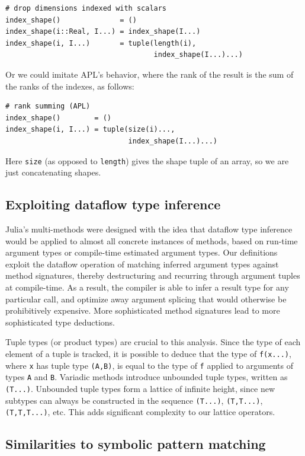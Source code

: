 \documentclass{sigplanconf}
\newcommand{\code}[1]{\texttt{#1}}
\begin{document}
{\small
\begin{verbatim}
# drop dimensions indexed with scalars
index_shape()              = ()
index_shape(i::Real, I...) = index_shape(I...)
index_shape(i, I...)       = tuple(length(i),
                                   index_shape(I...)...)
\end{verbatim}
}

Or we could imitate APL's behavior, where the rank of the result is the sum
of the ranks of the indexes, as follows:

{\small
\begin{verbatim}
# rank summing (APL)
index_shape()        = ()
index_shape(i, I...) = tuple(size(i)...,
                             index_shape(I...)...)
\end{verbatim}
}

Here \code{size} (as opposed to \code{length}) gives the shape tuple of an array,
so we are just concatenating shapes.


\subsection{Exploiting dataflow type inference}

Julia's multi-methods were designed with the idea that dataflow type inference
would be applied to almost all concrete instances of methods, based on
run-time argument types or compile-time estimated argument types.
Our definitions exploit the dataflow operation of matching inferred argument types
against method signatures, thereby destructuring and recurring through argument
tuples at compile-time. As a result, the compiler is able to infer a result type
for any particular call, and optimize away argument splicing that would otherwise
be prohibitively expensive. More sophisticated method signatures lead to more
sophisticated type deductions.

Tuple types (or product types) are crucial to this analysis. Since the type
of each element of a tuple is tracked, it is possible to deduce that
the type of \code{f(x...)}, where \code{x} has tuple type \code{(A,B)}, is
equal to the type of \code{f} applied to arguments of types \code{A} and
\code{B}. Variadic methods introduce unbounded tuple types, written as
\code{(T...)}. Unbounded tuple types form a lattice of infinite height,
since new subtypes can always be constructed in the sequence
\code{(T...)}, \code{(T,T...)}, \code{(T,T,T...)}, etc. This adds
significant complexity to our lattice operators.

\subsection{Similarities to symbolic pattern matching}
\end{document}
